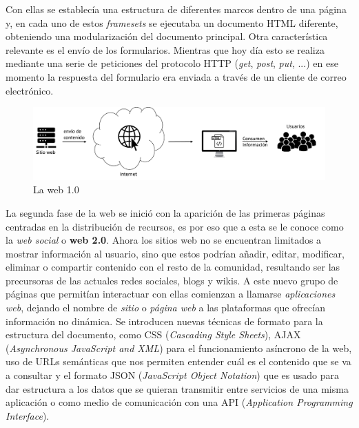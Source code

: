 \documentclass[../main.tex]{subfiles}
\begin{document}
    
    Con ellas se establecía una estructura de diferentes marcos dentro de una página y, en cada uno de estos \textit{framesets} se ejecutaba un documento HTML diferente, obteniendo una modularización del documento principal. Otra característica relevante es el envío de los formularios. Mientras que hoy día esto se realiza mediante una serie de peticiones del protocolo HTTP (\textit{get}, \textit{post}, \textit{put}, ...) en ese momento la respuesta del formulario era enviada a través de un cliente de correo electrónico.\\
     
     \begin{figure}[!h]
          \centering
          \includegraphics[width=\textwidth]{images/web1.0.png}
          \caption{La web 1.0}
          \label{fig:web1.0}
      \end{figure}
     
     La segunda fase de la web se inició con la aparición de las primeras páginas centradas en la distribución de recursos, es por eso que a esta se le conoce como la \textit{web social} o \textbf{web 2.0}. Ahora los sitios web no se encuentran limitados a mostrar información al usuario, sino que estos podrían añadir, editar, modificar, eliminar o compartir contenido con el resto de la comunidad, resultando ser las precursoras de las actuales redes sociales, blogs y wikis. A este nuevo grupo de páginas que permitían interactuar con ellas comienzan a llamarse \textit{aplicaciones web}, dejando el nombre de \textit{sitio} o \textit{página web} a las plataformas que ofrecían información no dinámica. Se introducen nuevas técnicas de formato para la estructura del documento, como CSS (\textit{Cascading Style Sheets}), AJAX (\textit{Asynchronous JavaScript and XML}) para el funcionamiento asíncrono de la web, uso de URLs semánticas que nos permiten entender cuál es el contenido que se va a consultar y el formato JSON (\textit{JavaScript Object Notation}) que es usado para dar estructura a los datos que se quieran transmitir entre servicios de una misma aplicación o como medio de comunicación con una API \cite{whatisAPI} (\textit{Application Programming Interface}).\\
\end{document}

